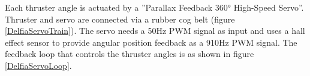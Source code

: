  \begin{figure}[h!]
	\centering
\end{figure}

Each thruster angle is actuated by a ''Parallax Feedback 360° High-Speed Servo''. Thruster and servo are connected via a rubber cog belt (figure \ref{DelfiaServoTrain}). The servo needs a 50Hz PWM signal as input and uses a hall effect sensor to provide angular position feedback as a 910Hz PWM signal. The feedback loop that controls the thruster angles is as shown in figure \ref{DelfiaServoLoop}.

